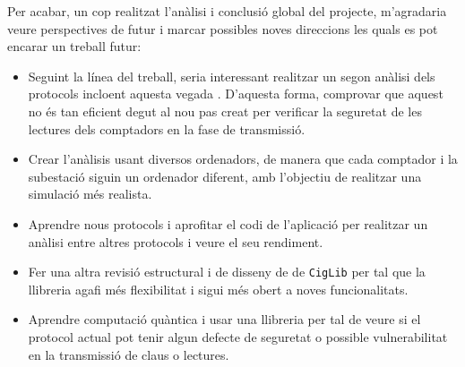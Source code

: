 \newpage
Per acabar, un cop realitzat l'anàlisi i conclusió global del projecte, m'agradaria veure perspectives de futur i marcar possibles noves direccions les quals es pot encarar un treball futur:
\begin{itemize}
	\item Seguint la línea del treball, seria interessant realitzar un segon anàlisi dels protocols incloent aquesta vegada \cite{repair-busom}. D'aquesta forma, comprovar que aquest no és tan eficient degut al nou pas creat per verificar la seguretat de les lectures dels comptadors en la fase de transmissió.
	\item Crear l'anàlisis usant diversos ordenadors, de manera que cada comptador i la subestació siguin un ordenador diferent, amb l'objectiu de realitzar una simulació més realista.
	\item Aprendre nous protocols i aprofitar el codi de l'aplicació per realitzar un anàlisi entre altres protocols i veure el seu rendiment.
	\item Fer una altra revisió estructural i de disseny de de \texttt{CigLib} per tal que la llibreria agafi més flexibilitat i sigui més obert a noves funcionalitats.
	\item Aprendre computació quàntica i usar una llibreria per tal de veure si el protocol actual pot tenir algun defecte de seguretat o possible vulnerabilitat en la transmissió de claus o lectures.
\end{itemize}

